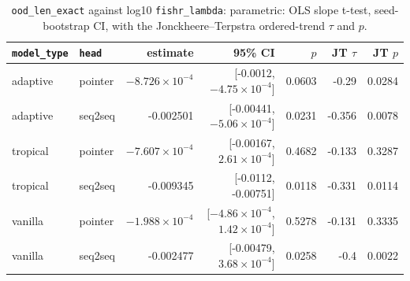 \documentclass[10pt]{article}
\begin{document}
{\small
\begin{longtable}{llrrrrr}
\caption{\texttt{ood\_len\_exact} against log10 \texttt{fishr\_lambda}: parametric: OLS slope t-test, seed-bootstrap CI, with the Jonckheere--Terpstra ordered-trend $\tau$ and $p$.}\label{tab:trend-ood_len_exact}\\
\toprule
\texttt{model\_type} & \texttt{head} & estimate & 95\% CI & $p$ & JT $\tau$ & JT $p$\\
\midrule
\endhead
adaptive & pointer & $-8.726\times10^{-4}$ & [-0.0012, $-4.75\times10^{-4}$] & 0.0603 & -0.29 & 0.0284\\
adaptive & seq2seq & -0.002501 & [-0.00441, $-5.06\times10^{-4}$] & 0.0231 & -0.356 & 0.0078\\
tropical & pointer & $-7.607\times10^{-4}$ & [-0.00167, $2.61\times10^{-4}$] & 0.4682 & -0.133 & 0.3287\\
tropical & seq2seq & -0.009345 & [-0.0112, -0.00751] & 0.0118 & -0.331 & 0.0114\\
vanilla & pointer & $-1.988\times10^{-4}$ & [$-4.86\times10^{-4}$, $1.42\times10^{-4}$] & 0.5278 & -0.131 & 0.3335\\
vanilla & seq2seq & -0.002477 & [-0.00479, $3.68\times10^{-4}$] & 0.0258 & -0.4 & 0.0022\\
\bottomrule
\end{longtable}
}
\end{document}
